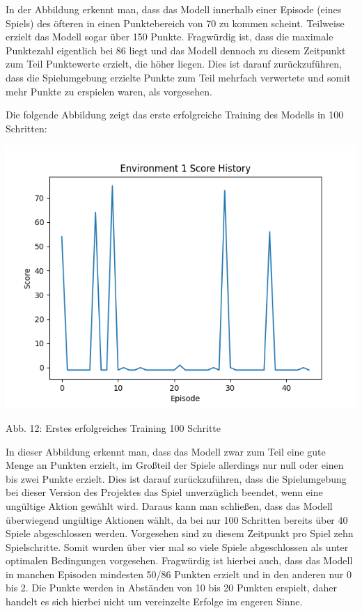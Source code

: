 In der Abbildung erkennt man, dass das Modell innerhalb einer Episode (eines Spiels) des öfteren in einen Punktebereich von 70 zu kommen scheint. Teilweise erzielt das Modell sogar über 150 Punkte. Fragwürdig ist, dass die maximale Punktezahl eigentlich bei 86 liegt und das Modell dennoch zu diesem Zeitpunkt zum Teil Punktewerte erzielt, die höher liegen. Dies ist darauf zurückzuführen, dass die Spielumgebung erzielte Punkte zum Teil mehrfach verwertete und somit mehr Punkte zu erspielen waren, als vorgesehen.

\begin{minipage}{\linewidth}
	Die folgende Abbildung zeigt das erste erfolgreiche Training des Modells in 100 Schritten:
	
	\vspace{0.5cm}
	\includegraphics[width=1\textwidth]{Bilder/firstpropertraining100steps}
	
	Abb. 12: Erstes erfolgreiches Training 100 Schritte\\
\end{minipage}

In dieser Abbildung erkennt man, dass das Modell zwar zum Teil eine gute Menge an Punkten erzielt, im Großteil der Spiele allerdings nur null oder einen bis zwei Punkte erzielt. Dies ist darauf zurückzuführen, dass die Spielumgebung bei dieser Version des Projektes das Spiel unverzüglich beendet, wenn eine ungültige Aktion gewählt wird. Daraus kann man schließen, dass das Modell überwiegend ungültige Aktionen wählt, da bei nur 100 Schritten bereits über 40 Spiele abgeschlossen werden. Vorgesehen sind zu diesem Zeitpunkt pro Spiel zehn Spielschritte. Somit wurden über vier mal so viele Spiele abgeschlossen als unter optimalen Bedingungen vorgesehen. Fragwürdig ist hierbei auch, dass das Modell in manchen Episoden mindesten 50/86 Punkten erzielt und in den anderen nur 0 bis 2. Die Punkte werden in Abständen von 10 bis 20 Punkten erspielt, daher handelt es sich hierbei nicht um vereinzelte Erfolge im engeren Sinne.
